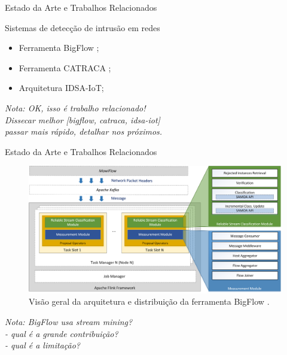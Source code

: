 \documentclass[aspectratio=43,10pt]{beamer}
\newcommand{\nota}[1]{\hspace*{-0.5cm}\textit{{\color[rgb]{1,0,0}Nota: #1}}}
\begin{document}
\newcommand{\idsiot}{IDSA-IoT\xspace}

\begin{frame}[fragile]{Estado da Arte e Trabalhos Relacionados}
\begin{alertblock}{Sistemas de detecção de intrusão em redes}
  \begin{itemize}
    \item Ferramenta BigFlow \cite{Viegas2019};
    \item Ferramenta CATRACA \cite{Lopez2018};
    \item Arquitetura \idsiot \cite{Cassales2019a};
  \end{itemize}
\end{alertblock}
\nota{OK, isso é trabalho relacionado!\\
Dissecar melhor [bigflow, catraca, idsa-iot]\\
passar mais rápido, detalhar nos próximos.}
\end{frame}

\begin{frame}[fragile]{Estado da Arte e Trabalhos Relacionados}
\begin{figure}[ht]
  \centering
  \includegraphics[width=\textwidth]{figuras/bigflow-fig5-bigflow_arch.png}
  \caption{Visão geral da arquitetura e distribuição da ferramenta BigFlow \cite{Viegas2019}.}
  \label{fig:bigflow-arch}
\end{figure}
\nota{BigFlow usa stream mining?\\
- qual é a grande contribuição?\\
- qual é a limitação?}
\end{frame}
\end{document}
